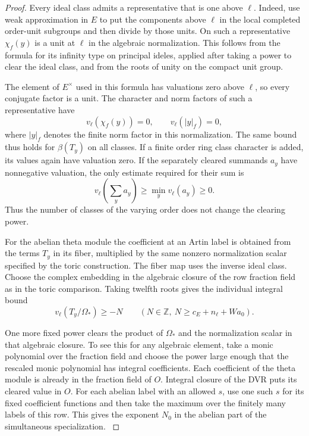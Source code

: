 \begin{proof}
Every ideal class admits a representative that is one
above \(\ell\). Indeed, use weak approximation in \(E\)
to put the components above \(\ell\) in the local
completed order-unit subgroups and then divide by those
units. On such a representative \(\chi_f(y)\) is a unit
at \(\ell\) in the algebraic normalization. This follows
from the formula for its infinity type on principal
ideles, applied after taking a power to clear the ideal
class, and from the roots of unity on the compact unit
group.

The element of \(E^\times\) used in this formula
has valuations zero above \(\ell\), so every conjugate
factor is a unit. The character and norm factors of such a representative have
\[
 v_\ell(\chi_f(y))=0,\qquad v_\ell(|y|_f)=0,
\]
where \(|y|_f\) denotes the finite norm factor in this normalization.
The same bound thus holds for \(\beta(T_y)\) on all
classes. If a finite order ring class character is added,
its values again have valuation zero. If the separately cleared summands \(a_y\) have nonnegative valuation, the only estimate required for their sum is
\[
 v_\ell\!\left(\sum_y a_y\right)\ge\min_y v_\ell(a_y)\ge0.
\]
Thus the number of classes of the varying order does not change the clearing power.

For the abelian theta module the coefficient at an Artin
label is obtained from the terms \(T_y\) in its fiber,
multiplied by the same nonzero normalization scalar
specified by the toric construction. The fiber map
uses the inverse ideal class. Choose the complex
embedding in the algebraic closure of the row fraction
field as in the toric comparison. Taking twelfth roots gives the individual integral bound
\[
 v_\ell(T_y/\Omega_*)\ge -N\qquad(N\in\mathbb Z,\ N\ge c_E+n_\ell+Wa_0).
\]

One more fixed power clears the product of
\(\Omega_*\) and the normalization scalar in that
algebraic closure. To see this for any algebraic element,
take a monic polynomial over the fraction field and
choose the power large enough that the rescaled monic
polynomial has integral coefficients. Each coefficient
of the theta module is already in the fraction field
of \(O\). Integral closure of the DVR puts its cleared
value in \(O\). For each abelian label with an allowed
\(s\), use one such \(s\) for its fixed coefficient
functions and then take the maximum over the finitely
many labels of this row. This gives the exponent \(N_0\)
in the abelian part of the simultaneous specialization.
\label{cor:toric-twist-1}
\end{proof}

